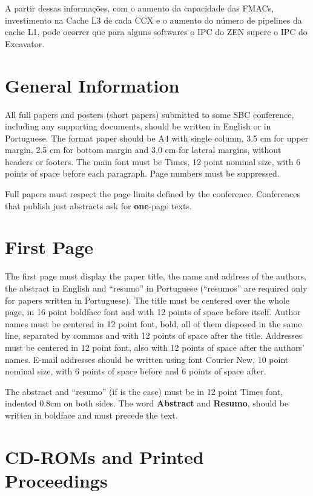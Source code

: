 \documentclass[12pt]{article}
\begin{document}
A partir dessas informações, com o aumento da capacidade das FMACs, investimento na Cache L3 de cada CCX e o aumento do número de pipelines da cache L1, pode ocorrer que para alguns softwares o IPC do ZEN supere o IPC do Excavator.

\section{General Information}

All full papers and posters (short papers) submitted to some SBC conference,
including any supporting documents, should be written in English or in
Portuguese. The format paper should be A4 with single column, 3.5 cm for upper
margin, 2.5 cm for bottom margin and 3.0 cm for lateral margins, without
headers or footers. The main font must be Times, 12 point nominal size, with 6
points of space before each paragraph. Page numbers must be suppressed.

Full papers must respect the page limits defined by the conference.
Conferences that publish just abstracts ask for \textbf{one}-page texts.

\section{First Page} \label{sec:firstpage}

The first page must display the paper title, the name and address of the
authors, the abstract in English and ``resumo'' in Portuguese (``resumos'' are
required only for papers written in Portuguese). The title must be centered
over the whole page, in 16 point boldface font and with 12 points of space
before itself. Author names must be centered in 12 point font, bold, all of
them disposed in the same line, separated by commas and with 12 points of
space after the title. Addresses must be centered in 12 point font, also with
12 points of space after the authors' names. E-mail addresses should be
written using font Courier New, 10 point nominal size, with 6 points of space
before and 6 points of space after.

The abstract and ``resumo'' (if is the case) must be in 12 point Times font,
indented 0.8cm on both sides. The word \textbf{Abstract} and \textbf{Resumo},
should be written in boldface and must precede the text.

\section{CD-ROMs and Printed Proceedings}
\end{document}
